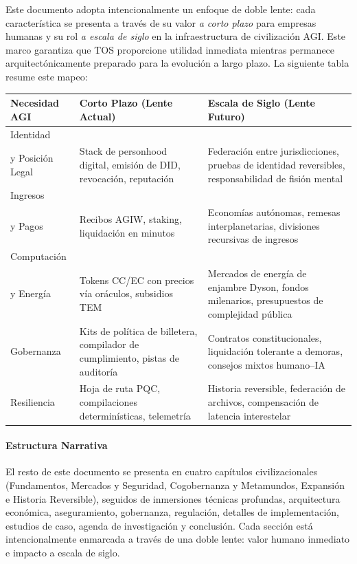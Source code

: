 \documentclass[11pt]{article}
\begin{document}
Este documento adopta intencionalmente un enfoque de doble lente: cada característica se presenta a través de su valor \emph{a corto plazo} para empresas humanas y su rol \emph{a escala de siglo} en la infraestructura de civilización AGI. Este marco garantiza que TOS proporcione utilidad inmediata mientras permanece arquitectónicamente preparado para la evolución a largo plazo. La siguiente tabla resume este mapeo:

\begin{longtable}{@{}p{}p{}p{}@{}}
\toprule
\textbf{Necesidad AGI} & \textbf{Corto Plazo (Lente Actual)} & \textbf{Escala de Siglo (Lente Futuro)} \\\midrule
Identidad \\ y Posición Legal & Stack de personhood digital, emisión de DID, revocación, reputación & Federación entre jurisdicciones, pruebas de identidad reversibles, responsabilidad de fisión mental \\
Ingresos \\ y Pagos & Recibos AGIW, staking, liquidación en minutos & Economías autónomas, remesas interplanetarias, divisiones recursivas de ingresos \\
Computación \\ y Energía & Tokens CC/EC con precios vía oráculos, subsidios TEM & Mercados de energía de enjambre Dyson, fondos milenarios, presupuestos de complejidad pública \\
Gobernanza & Kits de política de billetera, compilador de cumplimiento, pistas de auditoría & Contratos constitucionales, liquidación tolerante a demoras, consejos mixtos humano--IA \\
Resiliencia & Hoja de ruta PQC, compilaciones determinísticas, telemetría & Historia reversible, federación de archivos, compensación de latencia interestelar \\\bottomrule
\end{longtable}

\paragraph{Estructura Narrativa} El resto de este documento se presenta en cuatro capítulos civilizacionales (Fundamentos, Mercados y Seguridad, Cogobernanza y Metamundos, Expansión e Historia Reversible), seguidos de inmersiones técnicas profundas, arquitectura económica, aseguramiento, gobernanza, regulación, detalles de implementación, estudios de caso, agenda de investigación y conclusión. Cada sección está intencionalmente enmarcada a través de una doble lente: valor humano inmediato e impacto a escala de siglo.
\end{document}

